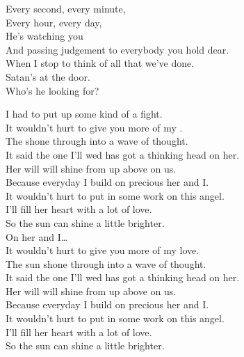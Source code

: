 Every second, every minute, \\
Every hour, every day, \\
He's watching you \\
And passing judgement to everybody you hold dear. \\
When I stop to think of all that we've done. \\
Satan's at the door. \\
Who's he looking for? \\





I had to put up some kind of a fight. \\
It wouldn't hurt to give you more of my . \\
The  shone through into a wave of thought. \\
It said the one I'll wed has got a thinking head on her. \\

Her will will shine from up above on us. \\
Because everyday I build on precious her and I. \\
It wouldn't hurt to put in some work on this angel. \\
I'll fill her heart with a lot of love. \\
So the sun can shine a little brighter. \\

On her and I… \\

It wouldn't hurt to give you more of my love. \\
The sun shone through into a wave of thought. \\
It said the one I'll wed has got a thinking head on her. \\
Her will will shine from up above on us. \\

Because everyday I build on precious her and I. \\
It wouldn't hurt to put in some work on this angel. \\
I'll fill her heart with a lot of love. \\
So the sun can shine a little brighter. \\

